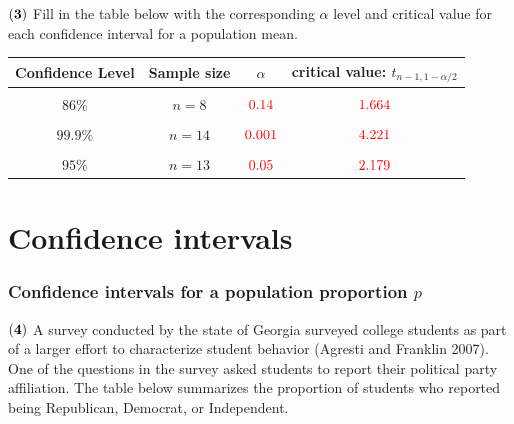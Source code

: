 \documentclass[
]{article}
\begin{document}
\(\bf (3)\) Fill in the table below with the corresponding \(\alpha\)
level and critical value for each confidence interval for a population
mean.

\begin{table}[H]
\centering\centering
\begin{tabular}{cccc}
\toprule
Confidence Level & Sample size & $\alpha$ & critical value: $t_{n-1, 1-\alpha/2}$\\
\midrule
\cellcolor{gray!10}{$92\%$} & \cellcolor{gray!10}{$n = 5$} & \cellcolor{gray!10}{$\color{red}{0.08}$} & \cellcolor{gray!10}{$\color{red}{2.333}$}\\
$86\%$ & $n = 8$ & $\color{red}{0.14}$ & $\color{red}{1.664}$\\
\cellcolor{gray!10}{$98\%$} & \cellcolor{gray!10}{$n = 11$} & \cellcolor{gray!10}{$\color{red}{0.02}$} & \cellcolor{gray!10}{$\color{red}{2.764}$}\\
$99.9\%$ & $n = 14$ & $\color{red}{0.001}$ & $\color{red}{4.221}$\\
\cellcolor{gray!10}{$82\%$} & \cellcolor{gray!10}{$n = 40$} & \cellcolor{gray!10}{$\color{red}{0.18}$} & \cellcolor{gray!10}{$\color{red}{1.365}$}\\
\addlinespace
$95\%$ & $n = 13$ & $\color{red}{0.05}$ & $\color{red}{2.179}$\\
\bottomrule
\end{tabular}
\end{table}

\section{Confidence intervals}\label{confidence-intervals}

\subsubsection{\texorpdfstring{Confidence intervals for a population
proportion
\(p\)}{Confidence intervals for a population proportion p}}\label{confidence-intervals-for-a-population-proportion-p}

\(\bf (4)\) A survey conducted by the state of Georgia surveyed college
students as part of a larger effort to characterize student behavior
(Agresti and Franklin 2007). One of the questions in the survey asked
students to report their political party affiliation. The table below
summarizes the proportion of students who reported being Republican,
Democrat, or Independent.
\end{document}
